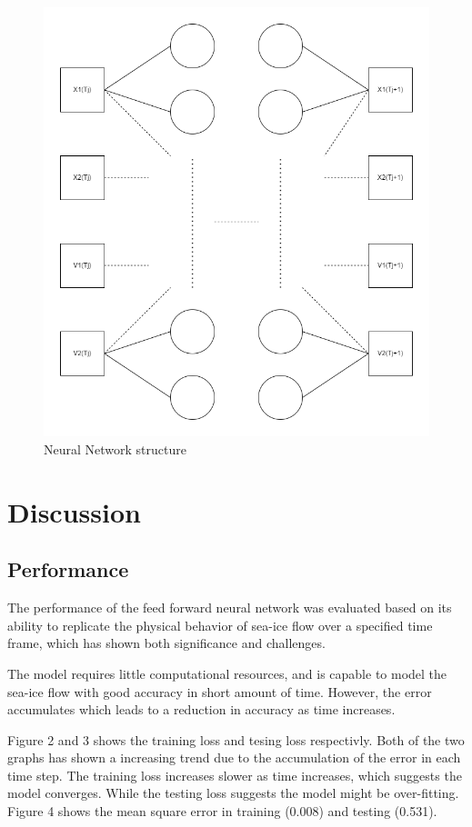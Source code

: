\documentclass[12pt, a4paper]{article}
\begin{document}
\begin{figure}
    \centering
    \includegraphics[scale=0.5]{../NN_graph.png}
    \caption[]{Neural Network structure}
    \label{fig:neural_network}
\end{figure}

\section{Discussion}
\subsection{Performance}
The performance of the feed forward neural network was evaluated based on its ability to replicate the physical behavior of sea-ice flow over a specified time frame, which has shown both significance and challenges. 

The model requires little computational resources, and is capable to model the sea-ice flow with good accuracy in short amount of time. However, the error accumulates which leads to a reduction in accuracy as time increases.

Figure 2 and 3 shows the training loss and tesing loss respectivly. Both of the two graphs has shown a increasing trend due to the accumulation of the error in each time step. The training loss increases slower as time increases, which suggests the model converges. While the testing loss suggests the model might be over-fitting. Figure 4 shows the mean square error in training (0.008) and testing (0.531).
\end{document}
